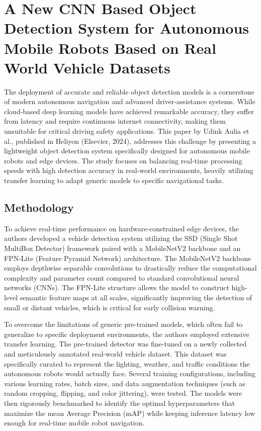 \section{A New CNN Based Object Detection System for Autonomous Mobile Robots Based on Real World Vehicle Datasets}

The deployment of accurate and reliable object detection models is a cornerstone of modern autonomous navigation and advanced driver-assistance systems. While cloud-based deep learning models have achieved remarkable accuracy, they suffer from latency and require continuous internet connectivity, making them unsuitable for critical driving safety applications. This paper by Udink Aulia et al., published in Heliyon (Elsevier, 2024), addresses this challenge by presenting a lightweight object detection system specifically designed for autonomous mobile robots and edge devices. The study focuses on balancing real-time processing speeds with high detection accuracy in real-world environments, heavily utilizing transfer learning to adapt generic models to specific navigational tasks.

\subsection{Methodology}
To achieve real-time performance on hardware-constrained edge devices, the authors developed a vehicle detection system utilizing the SSD (Single Shot MultiBox Detector) framework paired with a MobileNetV2 backbone and an FPN-Lite (Feature Pyramid Network) architecture. The MobileNetV2 backbone employs depthwise separable convolutions to drastically reduce the computational complexity and parameter count compared to standard convolutional neural networks (CNNs). The FPN-Lite structure allows the model to construct high-level semantic feature maps at all scales, significantly improving the detection of small or distant vehicles, which is critical for early collision warning.

To overcome the limitations of generic pre-trained models, which often fail to generalize to specific deployment environments, the authors employed extensive transfer learning. The pre-trained detector was fine-tuned on a newly collected and meticulously annotated real-world vehicle dataset. This dataset was specifically curated to represent the lighting, weather, and traffic conditions the autonomous robots would actually face. Several training configurations, including various learning rates, batch sizes, and data augmentation techniques (such as random cropping, flipping, and color jittering), were tested. The models were then rigorously benchmarked to identify the optimal hyperparameters that maximize the mean Average Precision (mAP) while keeping inference latency low enough for real-time mobile robot navigation.

